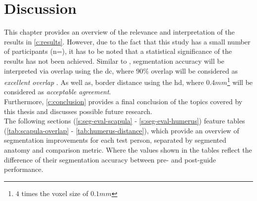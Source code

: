 
\chapter{Discussion}\label{c:discussion}
This chapter provides an overview of the relevance and interpretation of the results in \cref{c:results}.
However, due to the fact that this study has a small number of participants (n=\numberofTesters),
it has to be noted that a statistical significance of the results has not been achieved.
Similar to \citeauthor{andersenAccuracyPrecisionManual2018}, segmentation accuracy will be interpreted via overlap using the \acrfull{dc}, where $90\%$ overlap will be considered as \textit{excellent overlap} \cite{andersenAccuracyPrecisionManual2018}.
As well as, border distance using the \acrfull{hd}, where $0.4mm$\footnote{$4$ times the voxel size of $0.1mm$} will be considered as \textit{acceptable agreement}.\\
Furthermore, \cref{c:conclusion} provides a final conclusion of the topics covered by this thesis and discusses possible future research.\\

\noindent
The following sections (\cref{s:seg-eval-scapula} - \cref{s:seg-eval-humerus}) feature tables (\cref{tab:scapula-overlap} - \cref{tab:humerus-distance}), which provide an overview of segmentation improvements for each test person, separated by segmented anatomy and comparison metric.
Where the values shown in the tables reflect the difference of their segmentation accuracy between pre- and post-guide performance.


